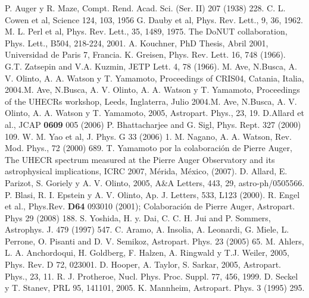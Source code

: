 \begin{thebibliography}{1}
 P. Auger y R. Maze, Compt. Rend. Acad. Sci. (Ser. II) 207 (1938) 228.
 C. L. Cowen et al, Science 124, 103, 1956
 G. Dauby et al, Phys. Rev. Lett., 9, 36, 1962.
 M. L. Perl et al, Phys. Rev. Lett., 35, 1489, 1975.
 The DoNUT collaboration, Phys. Lett., B504, 218-224, 2001.
 A. Kouchner, PhD Thesis, Abril 2001, Universidad de Paris 7, Francia.
 K. Greisen, Phys. Rev. Lett. 16, 748 (1966).
 G.T. Zatsepin and V.A. Kuzmin, JETP Lett. 4, 78 (1966).
 M. Ave, N.Busca, A. V. Olinto, A. A. Watson y T. Yamamoto, Proceedings of CRIS04, Catania, Italia, 2004.\newline  M. Ave, N.Busca, A. V. Olinto, A. A. Watson y T. Yamamoto, Proceedings of the UHECRs workshop, Leeds, Inglaterra, Julio 2004.\newline  M. Ave, N.Busca, A. V. Olinto, A. A. Watson y T. Yamamoto, 2005, Astropart. Phys., 23, 19.
 D.Allard et al., JCAP {\bf 0609} 005 (2006) 
 P. Bhattacharjee and G. Sigl, Phys. Rept. 327 (2000) 109.
 W. M. Yao et al, J. Phys. G 33 (2006) 1.
 M. Nagano, A. A. Watson, Rev. Mod. Phys., 72 (2000) 689.
 T. Yamamoto por la colaboración de Pierre Auger, The UHECR spectrum measured at the Pierre Auger Observatory and its astrophysical implications, ICRC 2007, Mérida, México, (2007).
 D. Allard, E. Parizot, S. Goriely y A. V. Olinto, 2005, A\&A Letters, 443, 29, astro-ph/0505566.
 P. Blasi, R. I. Epstein y A. V. Olinto, Ap. J. Letters, 533, L123 (2000).
 R. Engel et al., Phys.Rev. {\bf D64} 093010 (2001);     
 Colaboración de Pierre Auger, Astropart. Phys 29 (2008) 188.
 S. Yoshida, H. y. Dai, C. C. H. Jui and P. Sommers, Astrophys. J. 479 (1997) 547.
 C. Aramo, A. Insolia, A. Leonardi, G. Miele, L. Perrone, O. Pisanti and D. V. Semikoz, Astropart. Phys. 23 (2005) 65.
 M. Ahlers, L. A. Anchordoqui, H. Goldberg, F. Halzen, A. Ringwald y T.J. Weiler, 2005, Phys. Rev. D 72, 023001.
 D. Hooper, A. Taylor, S. Sarkar, 2005, Astropart. Phys., 23, 11.
 R. J. Protheroe, Nucl. Phys. Proc. Suppl. 77, 456, 1999.
 D. Seckel y T. Stanev, PRL 95, 141101, 2005.
 K. Mannheim, Astropart. Phys. 3 (1995) 295. 

\end{thebibliography}
